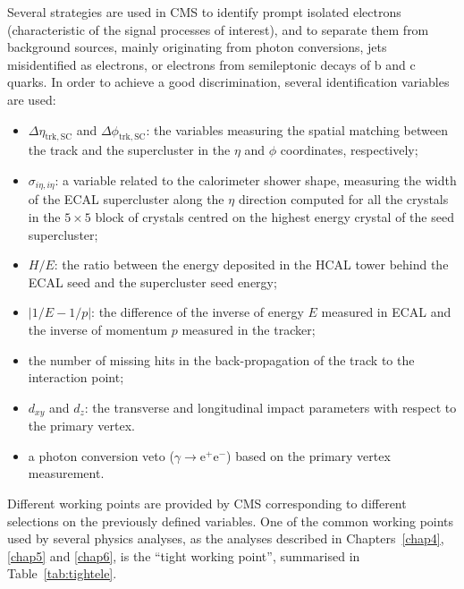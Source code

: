Several strategies are used in CMS to identify prompt isolated electrons (characteristic of the signal processes of interest), and to separate them from background sources, mainly originating from photon conversions, jets misidentified as electrons, or electrons from semileptonic decays of b and c quarks. In order to achieve a good discrimination, several identification variables are used:
\begin{itemize}
\item $\Delta\eta_\mathrm{trk,SC}$ and $\Delta\phi_\mathrm{trk,SC}$: the variables measuring the spatial matching between the track and the supercluster in the $\eta$ and $\phi$ coordinates, respectively;
\item $\sigma_{i\eta,i\eta}$: a variable related to the calorimeter shower shape, measuring the width of the ECAL supercluster along the $\eta$ direction computed for all the crystals in the $5
\times 5$ block of crystals centred on the highest energy crystal of the seed supercluster;
\item $H/E$: the ratio between the energy deposited in the HCAL tower behind the ECAL seed and the supercluster seed energy;
\item $|1/E - 1/p|$: the difference of the inverse of energy $E$ measured in ECAL and the inverse of momentum $p$ measured in the tracker;
\item the number of missing hits in the back-propagation of the track to the interaction point;
\item $d_{xy}$ and $d_z$: the transverse and longitudinal impact parameters with respect to the primary vertex.
\item a photon conversion veto ($\gamma \to \mathrm{e^+ e^-}$) based on the primary vertex measurement.
\end{itemize}

Different working points are provided by CMS corresponding to different selections on the previously defined variables. One of the common working points used by several physics analyses, as the \hww analyses described in Chapters~\ref{chap4}, \ref{chap5} and \ref{chap6}, is the ``tight working point'', summarised in Table~\ref{tab:tightele}.

